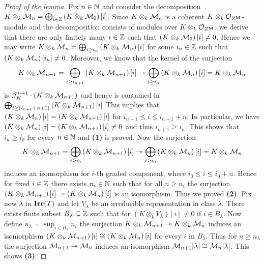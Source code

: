 \begin{proof}[Proof of the lemma]
Fix $n\in {\mathbb N}$ and consider the decomposition $K\otimes_k{\mathcal M}_n = \bigoplus_{i\in {\mathbb Z}}\left(K\otimes_k{\mathcal M}_0\right)[i]$. Since $K\otimes_k{\mathcal M}_n$ is a coherent $K\otimes_k {\mathcal O}_{Z^{\mathbf{M}}}$-module and the decomposition consists of modules over $K\otimes_k{\mathcal O}_{Z^{\mathbf{M}}}$, we derive that there are only finitely many $i\in {\mathbb Z}$ such that $\left(K\otimes_k{\mathcal M}_0\right)[i]\neq 0$. Hence we may write $K\otimes_k{\mathcal M}_n = \bigoplus_{i\geq i_n}\left(K\otimes_k{\mathcal M}_n\right)[i]$ for some $i_n\in {\mathbb Z}$ such that $\left(K\otimes_k{\mathcal M}_n\right)[i_n] \neq 0$. Moreover, we know that the kernel of the surjection
$$K\otimes_k{\mathcal M}_{n+1} = \bigoplus_{i\geq i_{n+1}}\left(K\otimes_k{\mathcal M}_{n+1}\right)[i] \twoheadrightarrow \bigoplus_{i\geq i_n}\left(K\otimes_k{\mathcal M}_n\right)[i] = K\otimes_k{\mathcal M}_n$$
is ${\mathcal J}_K^{n+1}\cdot \left(K\otimes_k{\mathcal M}_{n+1}\right)$ and hence is contained in $\bigoplus_{i\geq (i_{n+1}+n+1)}\left(K\otimes_k{\mathcal M}_{n+1}\right)[i]$
This implies that $\left(K\otimes_k{\mathcal M}_{n}\right)[i]  = \left(K\otimes_k{\mathcal M}_{n+1}\right)[i]$ for $i_{n+1}\leq i \leq i_{n+1}+n$. In particular, we have $\left(K\otimes_k{\mathcal M}_{n}\right)[i]  = \left(K\otimes_k{\mathcal M}_{n+1}\right)[i] \neq 0$ and thus $i_{n+1} \geq i_n$. This shows that $i_n\geq i_0$ for every $n\in {\mathbb N}$ and \textbf{(1)} is proved. Now the surjection
$$K\otimes_k{\mathcal M}_{n+1} = \bigoplus_{i\geq i_{0}}\left(K\otimes_k{\mathcal M}_{n+1}\right)[i] \twoheadrightarrow \bigoplus_{i\geq i_0}\left(K\otimes_k{\mathcal M}_n\right)[i] = K\otimes_k{\mathcal M}_n$$
induces an isomorphism for $i$-th graded component, where $i_0 \leq i\leq i_0+n$. Hence for fixed $i\in {\mathbb Z}$ there exists $n_i\in {\mathbb N}$ such that for all $n\geq n_i$ the surjection $\left(K\otimes_k{\mathcal M}_{n+1}\right)[i] \twoheadrightarrow \left(K\otimes_k{\mathcal M}_n\right)[i]$ is an isomorphism. Thus we proved \textbf{(2)}. Fix now $\lambda$ in $\mathbf{Irr}(T)$ and let $V_{\lambda}$ be an irreducible representation in class $\lambda$. There exists finite subset $B_{\lambda}\subseteq {\mathbb Z}$ such that for $\left(K\otimes_kV_{\lambda}\right)[i] \neq 0$ if $i\in B_{\lambda}$. Now define $n_{\lambda} = \sup_{i\in B_{\lambda}}n_i$ the surjection $K\otimes_k{\mathcal M}_{n+1}\twoheadrightarrow K\otimes_k{\mathcal M}_n$ induces an isomorphism $\left(K\otimes_k{\mathcal M}_{n+1}\right)[i] \cong \left(K\otimes_k{\mathcal M}_n\right)[i]$ for every $i$ in $B_{\lambda}$. Thus for $n\geq n_{\lambda}$ the surjection ${\mathcal M}_{n+1}\twoheadrightarrow {\mathcal M}_n$ induces an isomorphism ${\mathcal M}_{n+1}[\lambda]\cong {\mathcal M}_n[\lambda]$. This shows \textbf{(3)}.
\end{proof}


